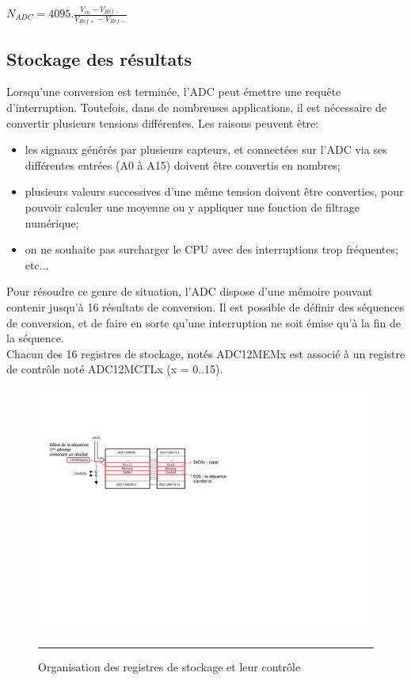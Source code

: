 \begin{tabbing}
  \begin{Large}
    \qquad $N_{ADC}=4095.\frac{V_{in}-V_{Ref-}}{V_{Ref+}-V_{Ref-}}$
  \end{Large}
\end{tabbing}


\subsection{Stockage des résultats}
Lorsqu'une conversion est terminée, l'ADC peut émettre une requête d'interruption. Toutefois, dans de nombreuses applications, il est nécessaire de convertir plusieurs tensions différentes. Les raisons peuvent être:
\begin{itemize}[label=\textbullet,font=\small]
  \item les signaux générés par plusieurs capteurs, et connectées sur l'ADC via ses différentes entrées (A0 à A15) doivent être convertis en nombres;
  \item plusieurs valeurs successives d'une même tension doivent être converties, pour pouvoir calculer une moyenne ou y appliquer une fonction de filtrage numérique;
  \item on ne souhaite pas surcharger le CPU avec des interruptions trop fréquentes;
  etc...
\end{itemize}

Pour résoudre ce genre de situation, l'ADC dispose d'une mémoire pouvant contenir jusqu'à 16 résultats de conversion. Il est possible de définir des séquences de conversion, et de faire en sorte qu'une interruption ne soit émise qu'à la fin de la séquence.\\
Chacun des 16 registres de stockage, notés ADC12MEMx est associé à un registre de contrôle noté ADC12MCTLx (x = 0..15).

\begin{figure}[H]
  \centering
  \includegraphics [angle=0, width=14cm]{./Figures/Chap11_ADC/ADC12Stockage.pdf}
  \rule{35em}{0.5pt}
  \caption{Organisation des registres de stockage et leur contrôle}
  \label{fig:ADC12Stockage}
\end{figure}

